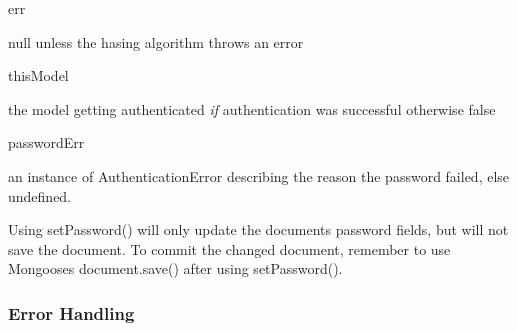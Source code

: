 \begin{DoxyItemize}
\item err
\begin{DoxyItemize}
\item null unless the hasing algorithm throws an error
\end{DoxyItemize}
\item this\+Model
\begin{DoxyItemize}
\item the model getting authenticated {\itshape if} authentication was successful otherwise false
\end{DoxyItemize}
\item password\+Err
\begin{DoxyItemize}
\item an instance of {\ttfamily Authentication\+Error} describing the reason the password failed, else undefined.
\end{DoxyItemize}
\end{DoxyItemize}

Using {\ttfamily set\+Password()} will only update the document\textquotesingle{}s password fields, but will not save the document. To commit the changed document, remember to use Mongoose\textquotesingle{}s {\ttfamily document.\+save()} after using {\ttfamily set\+Password()}.

\subsubsection*{Error Handling}


